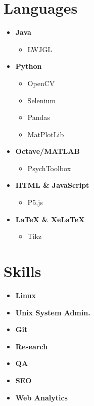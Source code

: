 \documentclass[]{chandan-cv}
\begin{document}
\begin{minipage}[t]{0.33\textwidth} 


\section{Languages}
	\begin{itemize}
		\item \textbf{Java}
			\begin{itemize}
				\item LWJGL
			\end{itemize}
		\item \textbf{Python}
			\begin{itemize}
				\item OpenCV
				\item Selenium
				\item Pandas
				\item MatPlotLib
			\end{itemize}
		\item \textbf{Octave/MATLAB}
			\begin{itemize}
				\item PsychToolbox
			\end{itemize}
		\item \textbf{HTML \& JavaScript}
			\begin{itemize}
				\item P5.js
			\end{itemize}
		\item \textbf{LaTeX \& XeLaTeX}
			\begin{itemize}
				\item Tikz
			\end{itemize}
	\end{itemize}
\sectionsep


\section{Skills}
	\begin{itemize}
		\item \textbf{Linux}
		\item \textbf{Unix System Admin.}
		\item \textbf{Git}
		\item \textbf{Research}
		\item \textbf{QA}
		\item \textbf{SEO}
		\item \textbf{Web Analytics}
	\end{itemize}
\sectionsep


\end{minipage}
\end{document}
